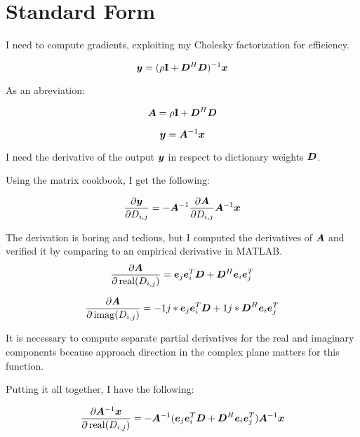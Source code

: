 \documentclass{article}
\begin{document}
\section{Standard Form}


I need to compute gradients, exploiting my Cholesky factorization for efficiency.

\begin{equation}
\bm{y} = (\rho{\bf I} + \bm{D}^H\bm{D})^{-1}\bm{x}
\end{equation}

As an abreviation:

\begin{equation}
\bm{A} = \rho{\bf I} + \bm{D}^H\bm{D}
\end{equation}

\begin{equation}
\bm{y} = \bm{A}^{-1}\bm{x}
\end{equation}

I need the derivative of the output $\bm{y}$ in respect to dictionary weights $\bm{D}$.

Using the matrix cookbook, I get the following:

\begin{equation}
\frac{\partial \bm{y}}{\partial D_{i,j}} = -\bm{A}^{-1} \frac{\partial \bm{A}}{\partial D_{i,j}} \bm{A}^{-1}\bm{x}
\end{equation}

The derivation is boring and tedious, but I computed the derivatives of $\bm{A}$ and verified it by comparing to an empirical derivative in MATLAB.
\begin{equation}
\frac{\partial \bm{A}}{\partial \operatorname{real}(D_{i,j})} = \bm{e}_j\bm{e}_i^T\bm{D} + \bm{D}^H\bm{e}_i\bm{e}_j^T
\end{equation}

\begin{equation}
\frac{\partial \bm{A}}{\partial \operatorname{imag}(D_{i,j})} = -1j*\bm{e}_j\bm{e}_i^T\bm{D} + 1j*\bm{D}^H\bm{e}_i\bm{e}_j^T
\end{equation}

It is necessary to compute separate partial derivatives for the real and imaginary components because approach direction in the complex plane matters for this function.

Putting it all together, I have the following:

\begin{equation}
\frac{\partial\bm{A}^{-1}\bm{x}}{\partial \operatorname{real}(D_{i,j})} = -\bm{A}^{-1}(\bm{e}_j\bm{e}_i^T\bm{D} + \bm{D}^H\bm{e}_i\bm{e}_j^T)\bm{A}^{-1}\bm{x}
\end{equation}
\end{document}
